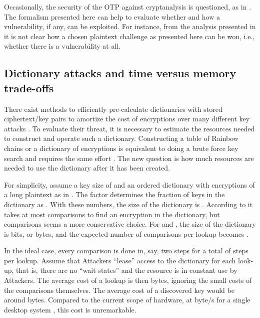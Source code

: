 \documentclass{article}
\begin{document}
Occasionally, the security of the OTP against cryptanalysis is questioned, as in 
\cite{Wang:cs0709.4420,Wang:cs0709.3334}. The formalism presented here can help to 
evaluate whether and how a vulnerability, if any, can be exploited.
For instance, from the analysis presented in \cite{Wang:cs0709.4420,Wang:cs0709.3334}
it is not clear how a chosen plaintext challenge as presented here can be won,
i.e., whether there is a vulnerability at all.

\subsection{Dictionary attacks and time versus memory trade-offs}

There exist methods to efficiently pre-calculate dictionaries with stored
ciphertext/key pairs to amortize the cost of encryptions over many different key
attacks \cite{an-Ping:cs0710.2970,Oechslin03}. To evaluate their threat, it is
necessary to estimate the resources needed to construct and operate such a
dictionary.
Constructing a table of Rainbow chains or a dictionary of
encryptions is equivalent to doing a brute force key search and requires the
same effort \cite{an-Ping:cs0710.2970,Oechslin03}.
The new question is how much resources are needed to use the dictionary
after it has been created.

For simplicity, assume a key size of  and an ordered 
dictionary with  encryptions of a  long plaintext 
as in \cite{an-Ping:cs0710.2970}. The factor  determines the fraction
of keys in the dictionary as . With these numbers, the size of
the dictionary is . According to \cite{an-Ping:cs0710.2970} it takes
at most  comparisons to find an encryption in the dictionary,
but  comparisons seems a more conservative choice. For  and
, the size of the dictionary is  bits,
or  bytes, and the expected number of comparisons per lookup
becomes .

In the ideal case, every comparison is done in, say, two steps for a total of
 steps per lookup. Assume that Attackers ``lease'' access to the
dictionary for each look-up, that is, there are no ``wait states'' and the resource
is in constant use by Attackers. The average
cost of a lookup is then  bytes, ignoring the small costs of the
comparisons themselves. The average cost of a discovered key would be around  bytes. Compared to the current scope of hardware, at 
byte/s for a single desktop system \cite{Son0911-5262}, this cost is unremarkable. 
\end{document}
